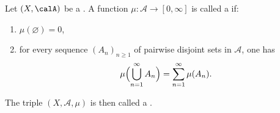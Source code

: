 \begin{definition} \label{definition:measure_on_a_measurable_space_valued_in_the_extended_real_line_and_measure_space}
    Let $(X, \calA)$ be a .
    A function $\mu : \mathcal{A} \to [0,\infty]$ is called a  if:
    \begin{enumerate}
    \item $\mu(\varnothing) = 0$,
    \item for every sequence $(A_n)_{n\ge 1}$ of pairwise disjoint sets in $\mathcal{A}$, one has
    $$\mu\Bigl(\bigcup_{n=1}^\infty A_n\Bigr) = \sum_{n=1}^\infty \mu(A_n).$$
    \end{enumerate}
    The triple $(X,\mathcal{A},\mu)$ is then called a .
\end{definition}